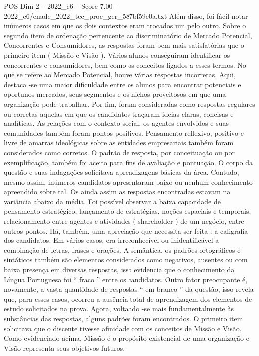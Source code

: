 \begin{textsample}{POS Dim 2 – 2022\_c6 – Score 7.00 – 2022\_c6/enade\_2022\_tec\_proc\_ger\_587bf59e0a.txt}
Além disso, foi fácil notar inúmeros casos em que os dois contextos eram trocados um pelo outro.
Sobre o segundo item de ordenação pertencente ao discriminatório de Mercado Potencial, Concorrentes e Consumidores, as respostas foram bem mais satisfatórias que o primeiro item ( Missão e Visão ).
Vários alunos conseguiram identificar os concorrentes e consumidores, bem como os conceitos ligados a esses termos.
No que se refere ao Mercado Potencial, houve várias respostas incorretas.
Aqui, destaca -se uma maior dificuldade entre os alunos para encontrar potenciais e oportunos mercados, seus segmentos e os nichos proveitosos em que uma organização pode trabalhar.
Por fim, foram consideradas como respostas regulares ou corretas aquelas em que os candidatos traçaram ideias claras, concisas e analíticas.
As relações com o contexto social, os agentes envolvidos e suas comunidades também foram pontos positivos.
Pensamento reflexivo, positivo e livre de amarras ideológicas sobre as entidades empresariais também foram considerados como corretos.
O padrão de resposta, por conceituação ou por exemplificação, também foi aceito para fins de avaliação e pontuação.
O corpo da questão e suas indagações solicitava aprendizagens básicas da área.
Contudo, mesmo assim, inúmeros candidatos apresentaram baixo ou nenhum conhecimento apreendido sobre tal.
Os ainda assim as respostas encontradas estavam na variância abaixo da média.
Foi possível observar a baixa capacidade de pensamento estratégico, lançamento de estratégias, noções espaciais e temporais, relacionamento entre agentes e atividades ( shareholder ) de um negócio, entre outros pontos.
Há, também, uma apreciação que necessita ser feita : a caligrafia dos candidatos.
Em vários casos, era irreconhecível ou inidentificável a combinação de letras, frases e orações.
A semântica, os padrões ortográficos e sintáticos também são elementos considerados como negativos, ausentes ou com baixa presença em diversas respostas, isso evidencia que o conhecimento da Língua Portuguesa foi “ fraco ” entre os candidatos.
Outro fator preocupante é, novamente, a vasta quantidade de respostas “ em branco ” da questão, isso revela que, para esses casos, ocorreu a ausência total de aprendizagem dos elementos de estudo solicitados na prova.
Agora, voltando -se mais fundamentalmente às substâncias das respostas, alguns padrões foram encontrados.
O primeiro item solicitava que o discente tivesse afinidade com os conceitos de Missão e Visão.
Como evidenciado acima, Missão é o propósito existencial de uma organização e Visão representa seus objetivos futuros.

\end{textsample}

